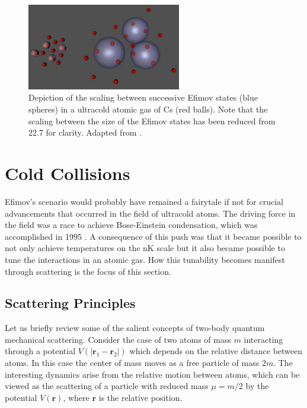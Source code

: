 \documentclass[prl,onecolumn,amsmath,amssymb,titlepage,nofootinbib,preprint]{revtex4-1}
\begin{document}
	
	\begin{figure}
		\includegraphics[width=0.6\textwidth]{Figures/efimov_scaling}
		\caption{Depiction of the scaling between successive Efimov states (blue spheres) in a ultracold atomic gas of Cs (red balls). Note that the scaling between the size of the Efimov states has been reduced from 22.7 for clarity.  Adapted from \cite{Modungo2014}.}
		\label{fig:efimov_cartoon}
	\end{figure}
\section{Cold Collisions}
Efimov's scenario would probably have remained a fairytale if not for crucial advancements that occurred in the field of ultracold atoms.  The driving force in the field was a race to achieve Bose-Einstein condensation, which was accomplished in 1995 \cite{Anderson1995}\cite{Bradley1995}\cite{Davis1995}.  A consequence of this push was that it became possible to not only achieve temperatures on the nK scale but it also became possible to tune the interactions in an atomic gas.  How this tunability becomes manifest through scattering is the focus of this section.
	\subsection{Scattering Principles}
	Let us briefly review some of the salient concepts of two-body quantum mechanical scattering.  Consider the case of two atoms of mass $m$ interacting through a potential  $V(|\mathbf{r}_1-\mathbf{r}_2|)$ which depends on the relative distance between atoms.  In this case the center of mass moves as a free particle of mass $2m$.  The interesting dynamics arise from the relative motion between atoms, which can be viewed as the scattering of a particle with reduced mass $\mu=m/2$ by the potential $V(\mathbf{r})$, where $\mathbf{r}$ is the relative position.
	
\end{document}
